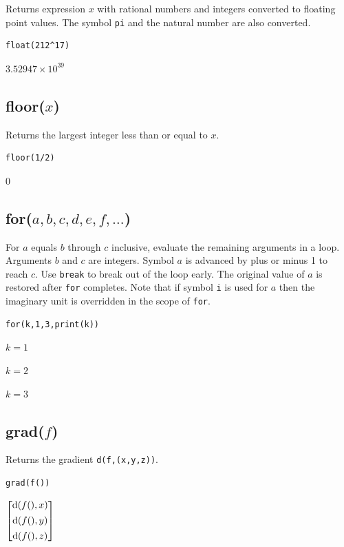 \documentclass[12pt]{article}
\begin{document}
Returns expression $x$ with rational numbers and integers converted to
floating point values.
The symbol {\tt pi} and the natural number are also converted.

{\color{blue}
\begin{verbatim}
float(212^17)
\end{verbatim}
}

$\displaystyle 3.52947\times 10^{39}$

\subsection*{floor($x$)}

Returns the largest integer less than or equal to $x$.

{\color{blue}
\begin{verbatim}
floor(1/2)
\end{verbatim}
}

$0$

\subsection*{for($a,b,c,d,e,f,\ldots$)}

For $a$ equals $b$ through $c$ inclusive, evaluate the remaining arguments in a loop.
Arguments $b$ and $c$ are integers.
Symbol $a$ is advanced by plus or minus 1 to reach $c$.
Use \verb$break$ to break out of the loop early.
The original value of $a$ is restored after \verb$for$ completes.
Note that if symbol \verb$i$ is used for $a$ then the imaginary unit is overridden
in the scope of \verb$for$.

{\color{blue}
\begin{verbatim}
for(k,1,3,print(k))
\end{verbatim}
}

$k=1$

$k=2$

$k=3$

\subsection*{grad($f$)}

Returns the gradient \verb$d(f,(x,y,z))$.

{\color{blue}
\begin{verbatim}
grad(f())
\end{verbatim}
}

$\displaystyle
\begin{bmatrix}
{\rm d}(f(),x)
\\[1ex]
{\rm d}(f(),y)
\\[1ex]
{\rm d}(f(),z)
\end{bmatrix}
$
\end{document}
